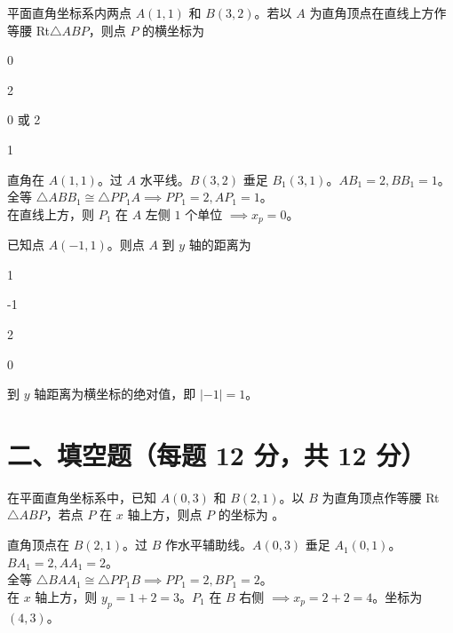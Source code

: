 \documentclass{exam-zh}
\begin{document}
\begin{question}[points=12]
  平面直角坐标系内两点 $A(1, 1)$ 和 $B(3, 2)$。若以 $A$ 为直角顶点在直线上方作等腰 Rt$\triangle ABP$，则点 $P$ 的横坐标为
  \begin{choices}
    \item 0
    \item 2
    \item 0 或 2
    \item 1
  \end{choices}
  \paren[A]
  \begin{solutionblock}
    直角在 $A(1,1)$。过 $A$ 水平线。$B(3,2)$ 垂足 $B_1(3,1)$。$AB_1 = 2, BB_1=1$。\\ 全等 $\triangle ABB_1 \cong \triangle PP_1A \implies PP_1 = 2, AP_1=1$。\\ 在直线上方，则 $P_1$ 在 $A$ 左侧 $1$ 个单位 $\implies x_p = 0$。
  \end{solutionblock}
\end{question}



\begin{question}[points=12]
  已知点 $A(-1, 1)$。则点 $A$ 到 $y$ 轴的距离为
  \begin{choices}
    \item 1
    \item -1
    \item 2
    \item 0
  \end{choices}
  \paren[A]
  \begin{solutionblock}
    到 $y$ 轴距离为横坐标的绝对值，即 $|-1| = 1$。
  \end{solutionblock}
\end{question}


\section*{二、填空题（每题 12 分，共 12 分）}


\begin{question}[points=12]
  在平面直角坐标系中，已知 $A(0, 3)$ 和 $B(2, 1)$。以 $B$ 为直角顶点作等腰 Rt$\triangle ABP$，若点 $P$ 在 $x$ 轴上方，则点 $P$ 的坐标为 \fillin。
  \paren[$(4, 3)$]
  \begin{solutionblock}
    直角顶点在 $B(2,1)$。过 $B$ 作水平辅助线。$A(0,3)$ 垂足 $A_1(0,1)$。$BA_1 = 2, AA_1 = 2$。\\ 全等 $\triangle BAA_1 \cong \triangle PP_1B \implies PP_1 = 2, BP_1 = 2$。\\ 在 $x$ 轴上方，则 $y_p = 1+2=3$。$P_1$ 在 $B$ 右侧 $\implies x_p = 2+2=4$。坐标为 $(4, 3)$。
  \end{solutionblock}
\end{question}
\end{document}
